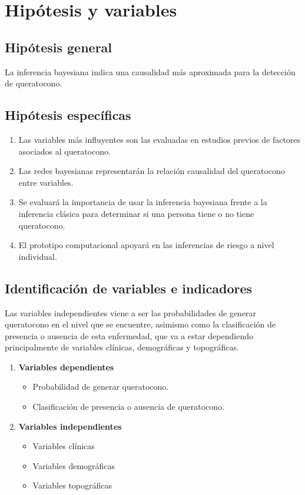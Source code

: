 \section{Hipótesis y variables}
\subsection{Hipótesis general}
La inferencia bayesiana indica una causalidad más aproximada para la detección de queratocono.

\subsection{Hipótesis específicas}
\begin{enumerate}
    \item Las variables más influyentes son las evaluadas en estudios previos de factores asociados al queratocono.
    \item Las redes bayesianas representarán la relación causalidad del queratocono entre variables.
    \item Se evaluará la importancia de usar la inferencia bayesiana frente a la inferencia clásica para determinar si una persona tiene o no tiene queratocono.
    \item El prototipo computacional apoyará en las inferencias de riesgo a nivel individual.
\end{enumerate}

\subsection{Identificación de variables e indicadores}
Las variables independientes viene a ser las probabilidades de generar queratocono en el nivel que se encuentre, asimismo como la clasificación de presencia o ausencia de esta enfermedad, que va a estar dependiendo principalmente de variables clínicas, demográficas y topográficas.

\begin{enumerate}
    \item \textbf{Variables dependientes}
    \begin{itemize}
        \item Probabilidad de generar queratocono.
        \item Clasificación de presencia o ausencia de queratocono. 
    \end{itemize}
    \item \textbf{Variables independientes} 
    \begin{itemize}
        \item Variables clínicas
        \item Variables demográficas
        \item Variables topográficas 
    \end{itemize}
\end{enumerate}

